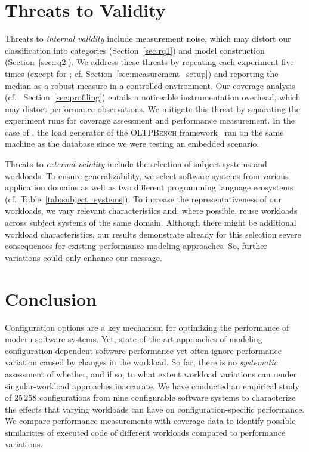 {{{\section{Threats to Validity}\label{sec:threats}
Threats to \textit{internal validity} include measurement noise, 
which may distort our classification into categories (Section~\ref{sec:rq1}) and model construction (Section~\ref{sec:rq2}). We address these threats by repeating each experiment five times  (except for \htwo; cf. Section~\ref{sec:measurement_setup}) and reporting the median as a robust measure in a controlled environment. Our coverage analysis (cf.~ Section~\ref{sec:profiling}) entails a noticeable instrumentation overhead, which may distort performance observations. We mitigate this threat by separating the experiment runs for coverage assessment and performance measurement. In the case of \htwo, the load generator of the \textsc{OLTPBench} framework~\cite{difallah_oltp_2013} ran on the same machine as the database since we were testing an embedded scenario. 	
	
Threats to\textit{ external validity} include the selection of subject systems and workloads. To ensure generalizability, we select software systems from various application domains as well as two different programming language ecosystems (cf.~Table~\ref{tab:subject_systems}). To increase the representativeness of our workloads, we vary relevant characteristics %
and, where possible, reuse workloads across subject systems of the same domain. Although there might be additional workload characteristics, our results demonstrate already for this selection severe consequences for existing performance modeling approaches. So, further variations could only enhance our message.

	

\section{Conclusion}\label{sec:conclusion}\color{black}
Configuration options are a key mechanism for optimizing the performance of modern software systems.
Yet, state-of-the-art approaches of modeling configuration-dependent software performance  yet often ignore performance variation caused by changes in the workload. So far, there is no \textit{systematic} assessment of whether, and if so, to what extent workload variations can render singular-workload approaches inaccurate. We have conducted an empirical study of 25\,258 configurations from nine configurable software systems to characterize the effects that varying workloads can have on configuration-specific performance. We compare performance measurements with coverage data to identify possible similarities of executed code of different workloads compared to performance variations. 

}}}
